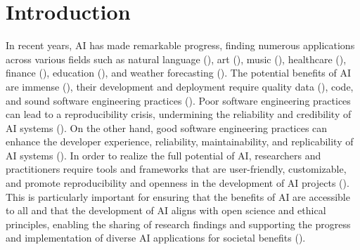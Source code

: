 
\section{Introduction}


 In recent years, AI has made remarkable progress, finding numerous applications across various fields such as natural language (\cite{gpt,gato}), art (\cite{diffusion}), music (\cite{musiclm}), healthcare (\cite{aihealthcare}), finance (\cite{bao2022fraudartificial}), education (\cite{aieducation}), and weather forecasting (\cite{weather}). The potential benefits of AI are immense (\cite{beneficialai,potencialaibenefit}), their development and deployment require quality data (\cite{lecun2015deep}), code, and sound software engineering practices (\cite{se4dl,amershi2019software}). Poor software engineering practices can lead to a reproducibility crisis, undermining the reliability and credibility of AI systems (\cite{leakage-recrisis}). On the other hand, good software engineering practices can enhance the developer experience, reliability, maintainability, and replicability of AI systems (\cite{se4dl,amershi2019software, wan2019does}). In order to realize the full potential of AI, researchers and practitioners require tools and frameworks that are user-friendly, customizable, and promote reproducibility and openness in the development of AI projects (\cite{lu2022softwareAIReponse,li2018can,wolf2020designing,olson2018system,ong2021guide,gundersen2018reproducible}). This is particularly important for ensuring that the benefits of AI are accessible to all and that the development of AI aligns with open science and ethical principles, enabling the sharing of research findings and supporting the progress and implementation of diverse AI applications for societal benefits (\cite{coro2020open,braun2018open, mittelstadt2016ethics,floridi2018ai4people,ong2021guide}).


